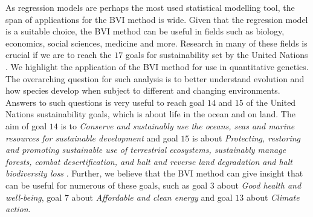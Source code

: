 As regression models are perhaps the most used statistical modelling tool, the span of applications for the BVI method is wide. Given that the regression model is a suitable choice, the BVI method can be useful in fields such as biology, economics, social sciences, medicine and more. Research in many of these fields is crucial if we are to reach the $17$ goals for sustainability set by the United Nations \citep{un_sdg_goals}. We highlight the application of the BVI method for use in quantitative genetics. The overarching question for such analysis is to better understand evolution and how species develop when subject to different and changing environments. Answers to such questions is very useful to reach goal $14$ and $15$ of the United Nations sustainability goals, which is about life in the ocean and on land. The aim of goal $14$ is to \textit{Conserve and sustainably use the oceans, seas and marine resources for sustainable development} and goal $15$ is about \textit{Protecting, restoring and promoting sustainable use of terrestrial ecosystems, sustainably manage forests, combat desertification, and halt and reverse land degradation and halt biodiversity loss} \citep{un_sdg_goals}. Further, we believe that the BVI method can give insight that can be useful for numerous of these goals, such as goal $3$ about \textit{Good health and well-being}, goal $7$ about \textit{Affordable and clean energy} and goal $13$ about \textit{Climate action}.
